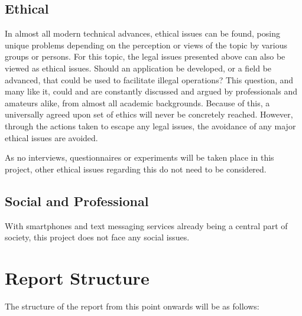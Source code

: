 \documentclass[a4paper,10pt]{report}
\begin{document}
\subsection{Ethical}

In almost all modern technical advances, ethical issues can be found, posing unique problems depending on the perception or views of the topic by various groups or persons. For this topic, the legal issues presented above can also be viewed as ethical issues. Should an application be developed, or a field be advanced, that could be used to facilitate illegal operations? This question, and many like it, could and are constantly discussed and argued by professionals and amateurs alike, from almost all academic backgrounds. Because of this, a universally agreed upon set of ethics will never be concretely reached. However, through the actions taken to escape any legal issues, the avoidance of any major ethical issues are avoided. 

As no interviews, questionnaires or experiments will be taken place in this project, other ethical issues regarding this do not need to be considered. 

\subsection{Social and Professional}

With smartphones and text messaging services already being a central part of society, this project does not face any social issues. %

\section{Report Structure}

The structure of the report from this point onwards will be as follows:
\end{document}

